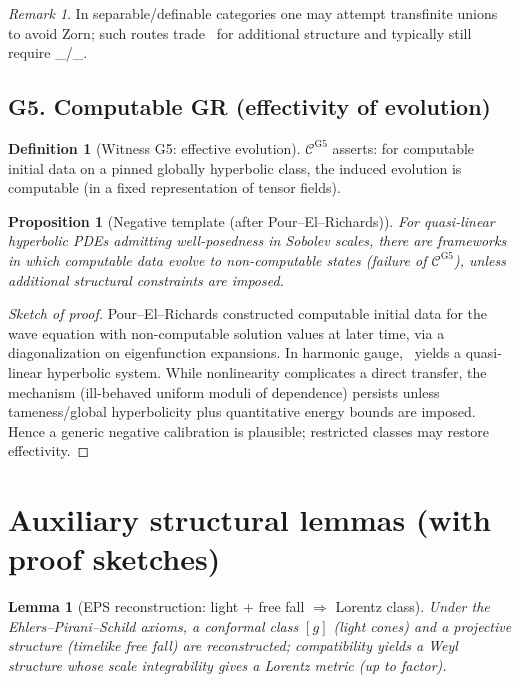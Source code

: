 \documentclass[11pt]{article}
\newtheorem{lemma}[theorem]{Lemma}
\newtheorem{proposition}[theorem]{Proposition}
\theoremstyle{definition}
\newtheorem{definition}[theorem]{Definition}
\theoremstyle{remark}
\newtheorem{remark}[theorem]{Remark}
\newcommand{\AC}{\mathrm{AC}}
\newcommand{\ACw}{\mathrm{AC}_\omega}
\newcommand{\DCw}{\mathrm{DC}_\omega}
\newcommand{\EFE}{\mathrm{EFE}}
\begin{document}
\begin{remark}
In separable/definable categories one may attempt transfinite unions to avoid Zorn; such routes trade \AC\ for additional structure and typically still require \DCw/\ACw.
\end{remark}

\subsection*{G5. Computable GR (effectivity of evolution)}
\begin{definition}[Witness G5: effective evolution]
$\mathcal{C}^{\mathrm{G5}}$ asserts: for computable initial data on a pinned globally hyperbolic class, the induced evolution is computable (in a fixed representation of tensor fields).
\end{definition}

\begin{proposition}[Negative template (after Pour--El--Richards)]\label{prop:G5-template}
For quasi-linear hyperbolic PDEs admitting well-posedness in Sobolev scales, there are frameworks in which computable data evolve to non-computable states (failure of $\mathcal{C}^{\mathrm{G5}}$), unless additional structural constraints are imposed.
\end{proposition}

\begin{proof}[Sketch of proof]
Pour--El--Richards \cite{PourElRichards1989} constructed computable initial data for the wave equation with non-computable solution values at later time, via a diagonalization on eigenfunction expansions. In harmonic gauge, \EFE\ yields a quasi-linear hyperbolic system. While nonlinearity complicates a direct transfer, the mechanism (ill-behaved uniform moduli of dependence) persists unless tameness/global hyperbolicity plus quantitative energy bounds are imposed. Hence a generic negative calibration is plausible; restricted classes may restore effectivity.
\end{proof}

\section{Auxiliary structural lemmas (with proof sketches)}
\begin{lemma}[EPS reconstruction: light + free fall $\Rightarrow$ Lorentz class]\label{lem:EPS}
Under the Ehlers--Pirani--Schild axioms, a conformal class $[g]$ (light cones) and a projective structure (timelike free fall) are reconstructed; compatibility yields a Weyl structure whose scale integrability gives a Lorentz metric (up to factor).
\end{lemma}
\end{document}
